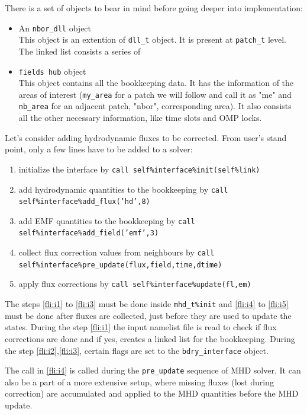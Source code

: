 \documentclass[paper=a4,fontsize=11pt]{scrartcl}
\numberwithin{equation}{section}		%
\numberwithin{figure}{section}			%
\numberwithin{table}{section}				%
\newcommand{\codecolor}{\color{Blue}}
\newcommand{\Code}[1]{{\codecolor\texttt{#1}}}
\begin{document}
There is a set of objects to bear in mind before going deeper into implementation:
\begin{itemize}
    \item An \Code{nbor\_dll} object \\
    This object is an extention of \Code{dll\_t} object.  It is present at \Code{patch\_t} level. The linked list consists a series of
    \item  \Code{fields hub} object\\
    This object contains all the bookkeeping data. It has the information of the areas of interest (\Code{my\_area} for a patch we will follow and call it as "me" and \Code{nb\_area} for an adjacent patch, "nbor", corresponding area). It also consists all the other necessary information, like time slots and OMP locks.
\end{itemize}

Let's consider adding hydrodynamic fluxes to be corrected. From user's stand point, only a few lines have to be added to a solver:
\begin{enumerate}
    \item \label{fli:i1} initialize the interface by \Code{call self\%interface\%init(self\%link)}
    \item \label{fli:i2} add hydrodynamic quantities to the bookkeeping by \Code{call self\%interface\%add\_flux('hd',8)}
    \item \label{fli:i3} add EMF quantities to the bookkeeping by \Code{call self\%interface\%add\_field('emf',3)}
    \item \label{fli:i4} collect flux correction values from neighbours by \Code{call self\%interface\%pre\_update(flux,field,time,dtime)}
    \item \label{fli:i5} apply flux corrections by \Code{call self\%interface\%update(fl,em)}
\end{enumerate}
The steps \ref{fli:i1} to \ref{fli:i3} must be done inside \Code{mhd\_t\%init} and \ref{fli:i4} to \ref{fli:i5} must be done after fluxes are collected, just before they are used to update the states. During the step \ref{fli:i1} the input namelist file is read to check if flux corrections are done and if yes, creates a linked list for the bookkeeping. During the step \ref{fli:i2},\ref{fli:i3}, certain flags are set to the \Code{bdry\_interface} object.

The call in \ref{fli:i4} is called during the \Code{pre\_update} sequence of MHD solver. It can also be a part of a more extensive setup, where missing fluxes (lost during correction) are accumulated and applied to the MHD quantities before the MHD update. 
\end{document}
